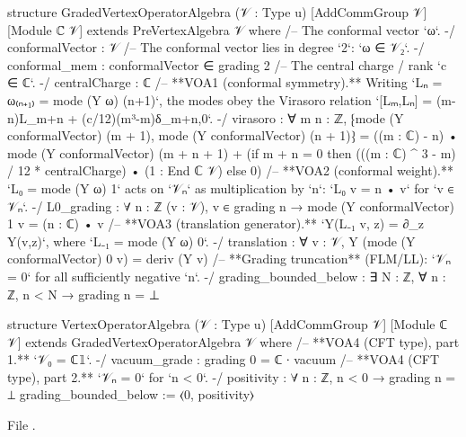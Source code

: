 \begin{leancode}
structure GradedVertexOperatorAlgebra (𝒱 : Type u) [AddCommGroup 𝒱] [Module ℂ 𝒱]
    extends PreVertexAlgebra 𝒱 where
  /-- The conformal vector `ω`. -/
  conformalVector : 𝒱
  /-- The conformal vector lies in degree `2`: `ω ∈ 𝒱₂`. -/
  conformal_mem : conformalVector ∈ grading 2
  /-- The central charge / rank `c ∈ ℂ`. -/
  centralCharge : ℂ
  /-- **VOA1 (conformal symmetry).** Writing `Lₙ = ω₍ₙ₊₁₎ = mode (Y ω) (n+1)`, the modes
  obey the Virasoro relation `[Lₘ,Lₙ] = (m-n)L_{m+n} + (c/12)(m³-m)δ_{m+n,0}`. -/
  virasoro : ∀ m n : ℤ,
      ⁅mode (Y conformalVector) (m + 1), mode (Y conformalVector) (n + 1)⁆
        = ((m : ℂ) - n) • mode (Y conformalVector) (m + n + 1)
          + (if m + n = 0 then (((m : ℂ) ^ 3 - m) / 12 * centralCharge) • (1 : End ℂ 𝒱)
             else 0)
  /-- **VOA2 (conformal weight).** `L₀ = mode (Y ω) 1` acts on `𝒱ₙ` as multiplication by
  `n`: `L₀ v = n • v` for `v ∈ 𝒱ₙ`. -/
  L0_grading : ∀ {n : ℤ} (v : 𝒱), v ∈ grading n → mode (Y conformalVector) 1 v = (n : ℂ) • v
  /-- **VOA3 (translation generator).** `Y(L₋₁ v, z) = ∂_z Y(v,z)`, where
  `L₋₁ = mode (Y ω) 0`. -/
  translation : ∀ v : 𝒱, Y (mode (Y conformalVector) 0 v) = deriv (Y v)
  /-- **Grading truncation** (FLM/LL): `𝒱ₙ = 0` for all sufficiently negative `n`. -/
  grading_bounded_below : ∃ N : ℤ, ∀ n : ℤ, n < N → grading n = ⊥

structure VertexOperatorAlgebra (𝒱 : Type u) [AddCommGroup 𝒱] [Module ℂ 𝒱]
    extends GradedVertexOperatorAlgebra 𝒱 where
  /-- **VOA4 (CFT type), part 1.** `𝒱₀ = ℂ𝟙`. -/
  vacuum_grade : grading 0 = ℂ ∙ vacuum
  /-- **VOA4 (CFT type), part 2.** `𝒱ₙ = 0` for `n < 0`. -/
  positivity : ∀ n : ℤ, n < 0 → grading n = ⊥
  grading_bounded_below := ⟨0, positivity⟩
\end{leancode}
File .

